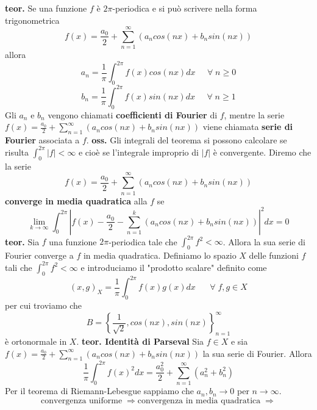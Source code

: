 \newline
\textbf{teor.} Se una funzione $f$ è $2\pi$-periodica e si può scrivere nella forma trigonometrica
\[
    f(x) = \frac{a_0}{2} + \sum_{n=1}^{\infty}(a_n cos(nx) + b_n sin(nx))
\]
allora
\[
    a_n = \frac{1}{\pi} \int_{0}^{2\pi} f(x) cos(nx) dx \;\;\;\; \;\forall\;n\geq0
\]
\[
    b_n = \frac{1}{\pi} \int_{0}^{2\pi} f(x) sin(nx) dx \;\;\;\;\;\forall\;n\geq 1
\]
Gli $a_n$ e $b_n$ vengono chiamati \textbf{coefficienti di Fourier} di $f$, mentre la serie $f(x) = \frac{a_0}{2} + \sum_{n=1}^{\infty}(a_n cos(nx) + b_n sin(nx))$ viene chiamata \textbf{serie di Fourier} associata a $f$.\newline
\newline
\textbf{oss.} Gli integrali del teorema si possono calcolare se risulta $\int_{0}^{2\pi}|f| < \infty$ e cioè se l'integrale improprio di $|f|$ è convergente.\newline
\newline
Diremo che la serie 
\[
    f(x) = \frac{a_0}{2} + \sum_{n=1}^{\infty}(a_n cos(nx) + b_n sin(nx))
\]
\textbf{converge in media quadratica} alla $f$ se
\[
    \lim_{k\rightarrow \infty} \int_{0}^{2\pi} \left| f(x) - \frac{a_0}{2} - \sum_{n=1}^{k}\left( a_n cos(nx) + b_n sin(nx) \right) \right|^2 dx = 0
\]
\newline
\textbf{teor.} Sia $f$ una funzione $2\pi$-periodica tale che $\int_{0}^{2\pi}f^2 < \infty$. Allora la sua serie di Fourier converge a $f$ in media quadratica.\newline
\newline
Definiamo lo spazio $X$ delle funzioni $f$ tali che $\int_{0}^{2\pi}f^2 < \infty$ e introduciamo il "prodotto scalare" definito come
\[
    (x,g)_{X} = \frac{1}{\pi}\int_{0}^{2\pi} f(x) g(x) dx \;\;\;\;\; \;\forall\;f,g \in X
\]
per cui troviamo che 
\[
    B = \left\{ \frac{1}{\sqrt{2}}, cos(nx), sin(nx) \right\}_{n=1} ^\infty
\]
è ortonormale in $X$.\newline
\newline
\textbf{teor. Identità di Parseval}\newline
Sia $f \in X$ e sia $f(x) = \frac{a_0}{2} + \sum_{n=1}^{\infty}(a_n cos(nx) + b_n sin(nx))$ la sua serie di Fourier. Allora
\[
    \frac{1}{\pi} \int_{0}^{2\pi} f(x)^2 dx = \frac{a_0^2}{2} + \sum_{n=1}^{\infty}(a_n^2 + b_n^2)
\]
Per il teorema di Riemann-Lebesgue sappiamo che $a_n, b_n \rightarrow  0$ per $n \rightarrow  \infty$.\newline
\newline
\[
\text{convergenza uniforme}\; \Rightarrow \text{convergenza in media quadratica}\; \Rightarrow 
\]
